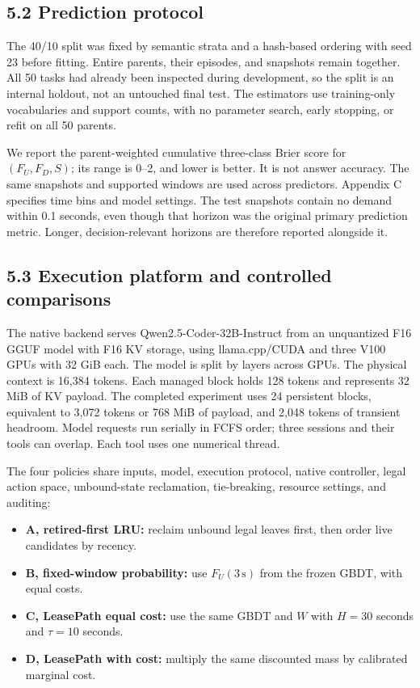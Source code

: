 \documentclass[
  english,
  10pt,
]{article}
\providecommand{\tightlist}{%
  \setlength{\itemsep}{0pt}\setlength{\parskip}{0pt}}
\begin{document}
\subsection{5.2 Prediction protocol}\label{prediction-protocol}

The 40/10 split was fixed by semantic strata and a hash-based ordering
with seed 23 before fitting. Entire parents, their episodes, and
snapshots remain together. All 50 tasks had already been inspected
during development, so the split is an internal holdout, not an
untouched final test. The estimators use training-only vocabularies and
support counts, with no parameter search, early stopping, or refit on
all 50 parents.

We report the parent-weighted cumulative three-class Brier score for
\((F_U,F_D,S)\); its range is 0--2, and lower is better. It is not
answer accuracy. The same snapshots and supported windows are used
across predictors. Appendix C specifies time bins and model settings.
The test snapshots contain no demand within 0.1 seconds, even though
that horizon was the original primary prediction metric. Longer,
decision-relevant horizons are therefore reported alongside it.

\subsection{5.3 Execution platform and controlled
comparisons}\label{execution-platform-and-controlled-comparisons}

The native backend serves Qwen2.5-Coder-32B-Instruct from an unquantized
F16 GGUF model with F16 KV storage, using llama.cpp/CUDA and three V100
GPUs with 32 GiB each. The model is split by layers across GPUs. The
physical context is 16,384 tokens. Each managed block holds 128 tokens
and represents 32 MiB of KV payload. The completed experiment uses 24
persistent blocks, equivalent to 3,072 tokens or 768 MiB of payload, and
2,048 tokens of transient headroom. Model requests run serially in FCFS
order; three sessions and their tools can overlap. Each tool uses one
numerical thread.

The four policies share inputs, model, execution protocol, native
controller, legal action space, unbound-state reclamation, tie-breaking,
resource settings, and auditing:

\begin{itemize}
\tightlist
\item
  \textbf{A, retired-first LRU:} reclaim unbound legal leaves first,
  then order live candidates by recency.
\item
  \textbf{B, fixed-window probability:} use \(F_U(3\,\mathrm{s})\) from
  the frozen GBDT, with equal costs.
\item
  \textbf{C, LeasePath equal cost:} use the same GBDT and \(W\) with
  \(H=30\) seconds and \(\tau=10\) seconds.
\item
  \textbf{D, LeasePath with cost:} multiply the same discounted mass by
  calibrated marginal cost.
\end{itemize}
\end{document}
